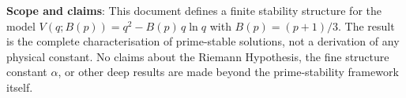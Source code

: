 \documentclass[12pt,a4paper]{article}
\theoremstyle{definition}
\theoremstyle{remark}
\begin{document}
\begin{infobox}
\textbf{Scope and claims}: This document defines a finite stability structure
for the model $V(q;B(p)) = q^2 - B(p)\,q\ln q$ with $B(p) = (p+1)/3$.
The result is the complete characterisation of prime-stable solutions, not a
derivation of any physical constant.  No claims about the Riemann Hypothesis,
the fine structure constant $\alpha$, or other deep results are made beyond the
prime-stability framework itself.
\end{infobox}

\ifdefined\INCLUDEMODE
\else
  
\end{document}
